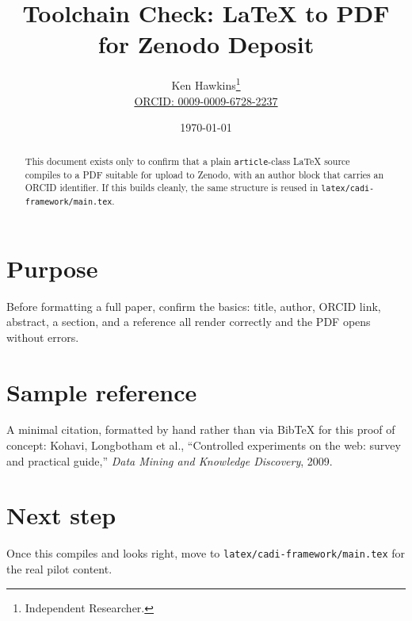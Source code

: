 \documentclass[11pt]{article}
\title{Toolchain Check: LaTeX to PDF for Zenodo Deposit}
\author{%
  Ken Hawkins\thanks{Independent Researcher.} \\
  \href{https://orcid.org/0009-0009-6728-2237}{ORCID: 0009-0009-6728-2237}
}
\date{\today}
\begin{document}
\maketitle

\begin{abstract}
This document exists only to confirm that a plain \texttt{article}-class
LaTeX source compiles to a PDF suitable for upload to Zenodo, with an
author block that carries an ORCID identifier. If this builds cleanly,
the same structure is reused in \texttt{latex/cadi-framework/main.tex}.
\end{abstract}

\section{Purpose}

Before formatting a full paper, confirm the basics: title, author,
ORCID link, abstract, a section, and a reference all render correctly
and the PDF opens without errors.

\section{Sample reference}

A minimal citation, formatted by hand rather than via BibTeX for this
proof of concept: Kohavi, Longbotham et al., ``Controlled experiments
on the web: survey and practical guide,'' \emph{Data Mining and
Knowledge Discovery}, 2009.

\section{Next step}

Once this compiles and looks right, move to
\texttt{latex/cadi-framework/main.tex} for the real pilot content.
\end{document}
